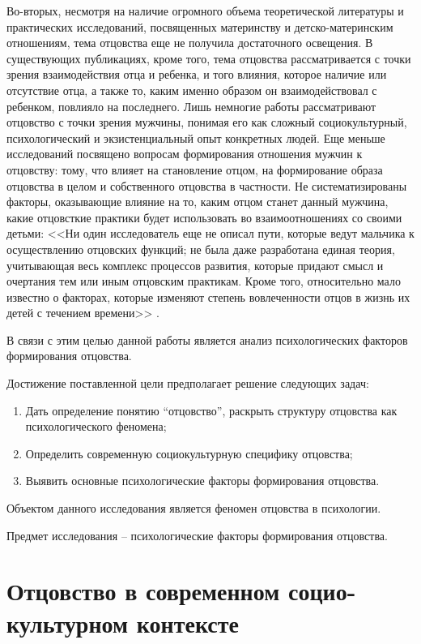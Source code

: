 \documentclass{../../common/thesisbyxetex}
\begin{document}
Во-вторых, несмотря на наличие огромного объема теоретической литературы и
практических исследований, посвященных материнству и детско-материнским отношениям, тема отцовства
еще не получила достаточного освещения. В существующих публикациях, кроме того, тема отцовства
рассматривается с точки зрения взаимодействия отца и ребенка, и того влияния, которое наличие
или отсутствие отца, а также то, каким именно образом он взаимодействовал с ребенком, повлияло на
последнего. Лишь немногие работы рассматривают отцовство с точки зрения мужчины,
понимая его как сложный социокультурный, психологический и экзистенциальный опыт конкретных людей.
Еще меньше исследований посвящено вопросам формирования отношения мужчин к отцовству:
тому, что влияет на становление отцом, на формирование образа отцовства в целом и собственного
отцовства в частности. Не систематизированы факторы, оказывающие влияние на то, каким отцом станет
данный мужчина, какие отцовсткие практики будет использовать во взаимоотношениях со своими детьми:
<<Ни один исследователь еще не описал пути, которые ведут мальчика к осуществлению отцовских
функций; не была даже разработана единая теория, учитывающая весь комплекс процессов развития,
которые придают смысл и очертания тем или иным отцовским практикам. Кроме того, относительно мало
известно о факторах, которые изменяют степень вовлеченности отцов в жизнь их детей с течением
времени>>  \cite[131]{f21}.

В связи с этим целью данной работы является анализ психологических факторов
формирования отцовства.

Достижение поставленной цели предполагает решение следующих задач:

\begin{enumerate}
	\item Дать определение понятию “отцовство”, раскрыть структуру отцовства как психологического
феномена;
	\item Определить современную социокультурную специфику отцовства;
	\item Выявить основные психологические факторы формирования отцовства.
\end{enumerate}

Объектом данного исследования является феномен отцовства в психологии.

Предмет исследования – психологические факторы формирования отцовства.


\chapter{Отцовство в современном социо-культурном контексте}
\end{document}
